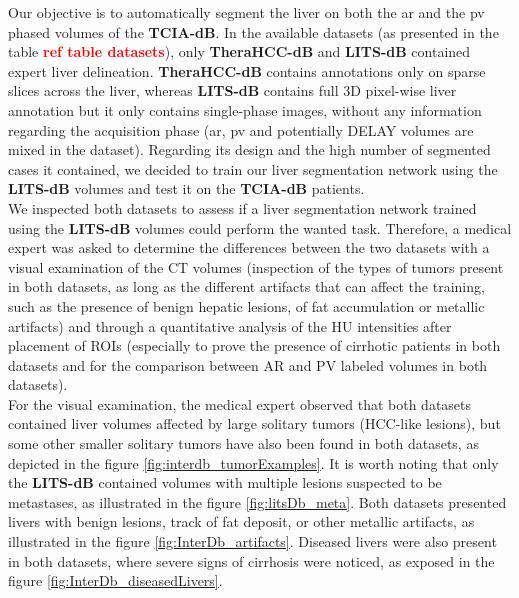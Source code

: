 \documentclass[]{article}
\newcommand{\lmttfont}[1]{{\fontfamily{lmtt}\selectfont #1}}
\begin{document}
Our objective is to automatically segment the liver on both the \ac{ar} and the \ac{pv} phased volumes of the \textbf{\lmttfont{TCIA-dB}}. In the available datasets (as presented in the table \textbf{\textcolor{red}{ref table datasets}}), only \textbf{\lmttfont{TheraHCC-dB}} and \textbf{\lmttfont{LITS-dB}} contained expert liver delineation. \textbf{\lmttfont{TheraHCC-dB}} contains annotations only on sparse slices across the liver, whereas \textbf{\lmttfont{LITS-dB}} contains full 3D pixel-wise liver annotation but it only contains single-phase images, without any information regarding the
acquisition phase (\ac{ar}, \ac{pv} and potentially DELAY volumes are mixed in the dataset).
Regarding its design and the high number of segmented cases it contained, we decided to train our liver segmentation network using the \textbf{\lmttfont{LITS-dB}} volumes and test it on the \textbf{\lmttfont{TCIA-dB}} patients.\\
We inspected both datasets to assess if a liver segmentation network trained using the \textbf{\lmttfont{LITS-dB}} volumes could perform the wanted task. Therefore, a medical expert was asked to determine the differences between the two datasets with a visual examination of the CT volumes (inspection of the types of tumors present in both datasets, as long as the different artifacts that can affect the training, such as the presence of benign hepatic lesions, of fat accumulation or metallic artifacts) and through a quantitative analysis of the HU intensities after placement of ROIs (especially to prove the presence of cirrhotic patients in both datasets and for the comparison between AR and PV labeled volumes in both datasets). \\
For the visual examination, the medical expert observed that both datasets contained liver volumes affected by large solitary tumors (HCC-like lesions), but some other smaller solitary tumors have also been found in both datasets, as depicted in the figure \ref{fig:interdb_tumorExamples}. It is worth noting that only the \textbf{\lmttfont{LITS-dB}} contained volumes with multiple lesions suspected to be metastases, as illustrated in the figure \ref{fig:litsDb_meta}. Both datasets presented livers with benign lesions, track of fat deposit, or other metallic artifacts, as illustrated in the figure \ref{fig:InterDb_artifacts}. Diseased livers were also present in both datasets, where severe signs of cirrhosis were noticed, as exposed in the figure \ref{fig:InterDb_diseasedLivers}.
\end{document}
